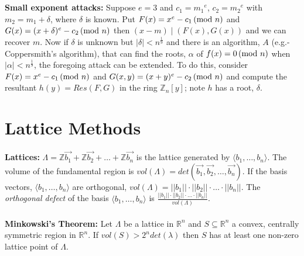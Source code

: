 \\
\\
{\bf Small exponent attacks:}  Suppose $e=3$ and 
$c_1= {m_1}^{e}$, $c_2= {m_2}^{e}$ with $m_2= m_1 + \delta$, where $\delta$ is known.
Put $F(x)= x^e-c_1 \thinspace \textnormal{(mod } n \textnormal{)}$ and
$G(x)= (x+\delta)^e-c_2 \thinspace \textnormal{(mod } n \textnormal{)}$ then $(x-m) \mid (F(x), G(x))$ and we can recover $m$.
Now if $\delta$ is unknown but $| \delta | < n^{\frac 1 9}$ and there is an algorithm, $A$
(e.g.- Coppersmith's algorithm),
that can find the roots, $\alpha$ of $f(x)=0 \thinspace \textnormal{(mod } n \textnormal{)}$ when $| \alpha|< n^{\frac 1 9}$, the
foregoing attack can be extended.  To do this, consider $F(x)= x^e - c_1 \thinspace \textnormal{(mod } n \textnormal{)}$ and
$G(x,y)= (x+y)^e -c_2 \thinspace \textnormal{(mod } n \textnormal{)}$ and compute the resultant $h(y)= Res(F,G)$ in the ring
${\mathbb Z}_n[y]$; note $h$ has a root, $\delta$.
\section {Lattice Methods}
{\bf Lattices:} 
$\Lambda = {\mathbb Z} {\vec {b_1}} + {\mathbb Z} {\vec {b_2}} + \ldots + {\mathbb Z} {\vec {b_n}}$
is the lattice generated by $\langle b_1 , \ldots , b_n \rangle$.  The volume of
the fundamental region is $vol(\Lambda) = det({\vec {b_1}}, {\vec {b_2}}, \ldots, {\vec {b_n}})$.
If the basis vectors, $\langle b_1 , \ldots , b_n \rangle$ are orthogonal,
$vol(\Lambda) = ||b_1|| \cdot ||b_2|| \cdot \ldots \cdot ||b_n||$.  The \emph{orthogonal defect}
of the basis $\langle b_1 , \ldots , b_n \rangle$ is ${\frac {||b_1|| \cdot ||b_2|| \cdot \ldots \cdot ||b_n||}
{vol(\Lambda)}}$.
\\
\\
{\bf Minkowski's Theorem: } Let $\Lambda$ be a lattice in ${\mathbb R}^n$ and $S \subseteq {\mathbb R}^n$
a convex, centrally symmetric region in ${\mathbb R}^n$.  If $vol(S) > 2^n det(\lambda)$ then $S$ has
at least one non-zero lattice point of $\Lambda$.
